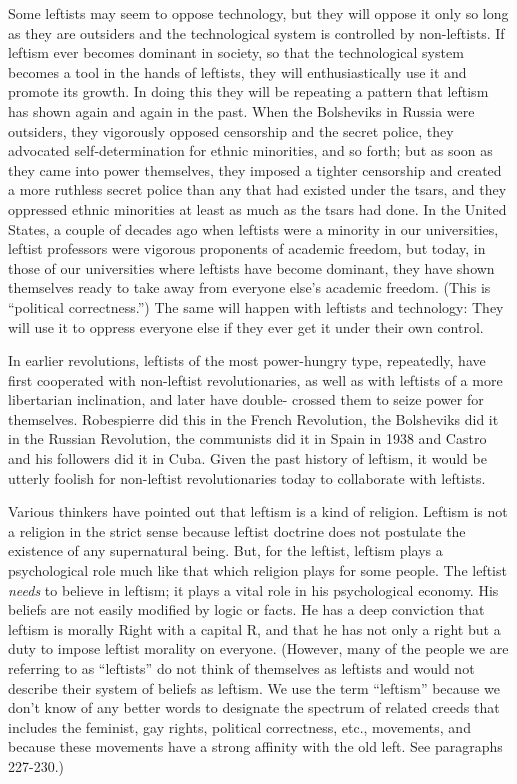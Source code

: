  Some leftists may seem to oppose technology, but they will oppose it only so long as they are outsiders and the technological system is controlled by non-leftists. If leftism ever becomes dominant in society, so that the technological system becomes a tool in the hands of leftists, they will enthusiastically use it and promote its growth. In doing this they will be repeating a pattern that leftism has shown again and again in the past. When the Bolsheviks in Russia were outsiders, they vigorously opposed censorship and the secret police, they advocated self-determination for ethnic minorities, and so forth; but as soon as they came into power themselves, they imposed a tighter censorship and created a more ruthless secret police than any that had existed under the tsars, and they oppressed ethnic minorities at least as much as the tsars had done. In the United States, a couple of decades ago when leftists were a minority in our universities, leftist professors were vigorous proponents of academic freedom, but today, in those of our universities where leftists have become dominant, they have shown themselves ready to take away from everyone else’s academic freedom. (This is “political correctness.”) The same will happen with leftists and technology: They will use it to oppress everyone else if they ever get it under their own control.

 In earlier revolutions, leftists of the most power-hungry type, repeatedly, have first cooperated with non-leftist revolutionaries, as well as with leftists of a more libertarian inclination, and later have double- crossed them to seize power for themselves. Robespierre did this in the French Revolution, the Bolsheviks did it in the Russian Revolution, the communists did it in Spain in 1938 and Castro and his followers did it in Cuba. Given the past history of leftism, it would be utterly foolish for non-leftist revolutionaries today to collaborate with leftists.

 Various thinkers have pointed out that leftism is a kind of religion. Leftism is not a religion in the strict sense because leftist doctrine does not postulate the existence of any supernatural being. But, for the leftist, leftism plays a psychological role much like that which religion plays for some people. The leftist {\em needs} to believe in leftism; it plays a vital role in his psychological economy. His beliefs are not easily modified by logic or facts. He has a deep conviction that leftism is morally Right with a capital R, and that he has not only a right but a duty to impose leftist morality on everyone. (However, many of the people we are referring to as “leftists” do not think of themselves as leftists and would not describe their system of beliefs as leftism. We use the term “leftism” because we don’t know of any better words to designate the spectrum of related creeds that includes the feminist, gay rights, political correctness, etc., movements, and because these movements have a strong affinity with the old left. See paragraphs 227-230.)

